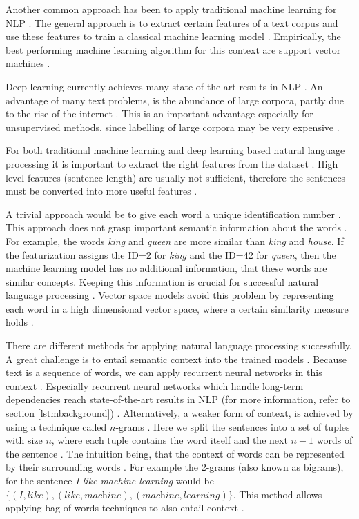 \documentclass[draft,final,oneside]{vutinfth} %
\begin{document}
Another common approach has been to apply traditional machine learning for NLP \cite{statisticalnlp}. The general approach is to extract certain features of a text corpus and use these features to train a classical machine learning model \cite{svmnlp}. Empirically, the best performing machine learning algorithm for this context are support vector machines \cite{svmnlp}.

Deep learning currently achieves many state-of-the-art results in NLP \cite{nmt}\cite{paraphrase}. An advantage of many text problems, is the abundance of large corpora, partly due to the rise of the internet \cite{bert}. This is an important advantage especially for unsupervised methods, since labelling of large corpora may be very expensive \cite{elmo}\cite{bert}.

For both traditional machine learning and deep learning based natural language processing it is important to extract the right features from the dataset \cite{statisticalnlp}. High level features (sentence length) are usually not sufficient, therefore the sentences must be converted into more useful features \cite{Yang2015HumorRA}.

A trivial approach would be to give each word a unique identification number \cite{deeplearningnlpstanford}. This approach does not grasp important semantic information about the words \cite{deeplearningnlpstanford}. For example, the words \textit{king} and \textit{queen} are more similar than \textit{king} and \textit{house}. If the featurization assigns the ID=2 for \textit{king} and the ID=42 for \textit{queen}, then the machine learning model has no additional information, that these words are similar concepts. Keeping this information is crucial for successful natural language processing \cite{nmt}\cite{elmo}. Vector space models avoid this problem by representing each word in a high dimensional vector space, where a certain similarity measure holds \cite{pennington2014glove}.

There are different methods for applying natural language processing successfully. A great challenge is to entail semantic context into the trained models \cite{statisticalnlp}. Because text is a sequence of words, we can apply recurrent neural networks in this context \cite{reviewRNN}. Especially recurrent neural networks which handle long-term dependencies reach state-of-the-art results in NLP (for more information, refer to section \ref{lstmbackground}) \cite{hochreiter}. Alternatively, a weaker form of context, is achieved by using a technique called $n$-grams \cite{ngrams}. Here we split the sentences into a set of tuples with size $n$, where each tuple contains the word itself and the next $n - 1$ words of the sentence  \cite{ngrams}. The intuition being, that the context of words can be represented by their surrounding words  \cite{ngrams}. For example the 2-grams (also known as bigrams), for the sentence \textit{I like machine learning} would be $\{(\textit{I}, \textit{like}), (\textit{like}, \textit{machine}), (\textit{machine}, \textit{learning})\}$. This method allows applying bag-of-words techniques to also entail context \cite{bagofwordbigramexample}.
\end{document}
